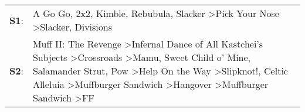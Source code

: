 \begin{supertabular}{p{0.03\textwidth}p{0.92\textwidth}}
 \textbf{S1}:  &                                                                                                                                                                                                                                                                                                                                                                                                               A Go Go\textsuperscript{}, \enspace 2x2\textsuperscript{}, \enspace Kimble\textsuperscript{}, \enspace Rebubula\textsuperscript{}, \enspace Slacker\textsuperscript{} \textgreater \enspace Pick Your Nose\textsuperscript{} \textgreater \enspace Slacker\textsuperscript{}, \enspace Divisions\textsuperscript{}  \enspace  \\
 \textbf{S2}:  &  Muff II: The Revenge\textsuperscript{} \textgreater \enspace Infernal Dance of All Kastchei's Subjects\textsuperscript{} \textgreater \enspace Crossroads\textsuperscript{} \textgreater \enspace Mamu\textsuperscript{}, \enspace Sweet Child o' Mine\textsuperscript{}, \enspace Salamander Strut\textsuperscript{}, \enspace Pow\textsuperscript{} \textgreater \enspace Help On the Way\textsuperscript{} \textgreater \enspace Slipknot!\textsuperscript{}, \enspace Celtic Alleluia\textsuperscript{} \textgreater \enspace Muffburger Sandwich\textsuperscript{} \textgreater \enspace Hangover\textsuperscript{} \textgreater \enspace Muffburger Sandwich\textsuperscript{} \textgreater \enspace FF\textsuperscript{}  \enspace  \\
\end{supertabular}

